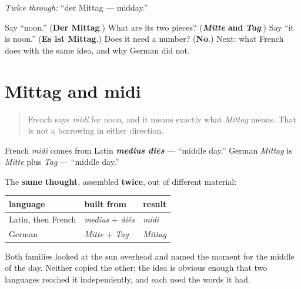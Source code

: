 \emph{Twice through:} \textquotedblleft{}der Mittag — midday.\textquotedblright{}

\begin{tcolorbox}[breakable,colback=teal!4,colframe=teal!35!black,title={Before you move on}]
Say \textquotedblleft{}noon.\textquotedblright{} (\textbf{Der Mittag}.) What are its two pieces? (\emph{\textbf{Mitte}} \textbf{and} \emph{\textbf{Tag}}.) Say \textquotedblleft{}it is noon.\textquotedblright{} (\textbf{Es ist Mittag}.) Does it need a number? (\textbf{No}.) Next: what French does with the same idea, and why German did not.
\end{tcolorbox}
\section[Mittag und midi]{Mittag and midi}

\label{lesson:GE-C08-mittag-midi}



\begin{quote}
French says \emph{midi} for noon, and it means exactly what \emph{Mittag} means. That is not a borrowing in either direction.
\end{quote}

\begin{cousinweb}
French \emph{midi} comes from Latin \emph{\textbf{medius diēs}} — \textquotedblleft{}middle day.\textquotedblright{} German \emph{Mittag} is \emph{Mitte} plus \emph{Tag} — \textquotedblleft{}middle day.\textquotedblright{}

The \textbf{same thought}, assembled \textbf{twice}, out of different material:

\noindent
\begin{tabularx}{\linewidth}{@{}>{\raggedright\arraybackslash}X>{\raggedright\arraybackslash}X>{\raggedright\arraybackslash}X@{}}
\toprule
\textbf{language} & \textbf{built from} & \textbf{result} \\
\midrule
Latin, then French & \emph{medius} + \emph{diēs} & \emph{midi} \\
German & \emph{Mitte} + \emph{Tag} & \emph{Mittag} \\
\bottomrule
\end{tabularx}

Both families looked at the sun overhead and named the moment for the middle of the day. Neither copied the other; the idea is obvious enough that two languages reached it independently, and each used the words it had.
\end{cousinweb}

